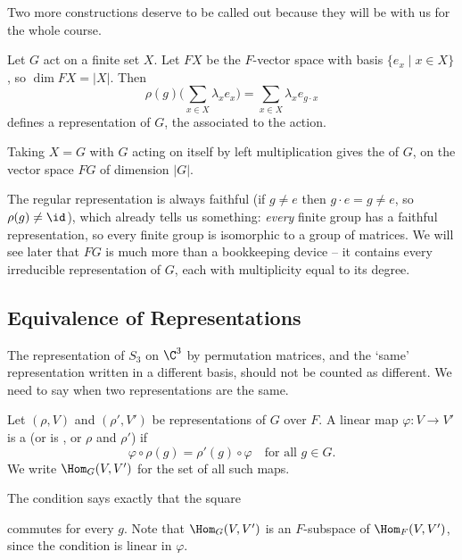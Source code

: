 Two more constructions deserve to be called out because they will be with us for the whole course.

\begin{definition}
	Let $G$ act on a finite set $X$. Let $FX$ be the $F$-vector space with basis $\{e_x \mid x \in X\}$, so $\dim FX = |X|$. Then
	$$\rho(g)\Big(\sum_{x \in X} \lambda_x e_x\Big) = \sum_{x \in X} \lambda_x e_{g \cdot x}$$
	defines a representation of $G$, the  associated to the action.
\end{definition}

\begin{definition}
	Taking $X = G$ with $G$ acting on itself by left multiplication gives the  of $G$, on the vector space $FG$ of dimension $|G|$.
\end{definition}

The regular representation is always faithful (if $g \neq e$ then $g \cdot e = g \neq e$, so $\rho(g) \neq \id$), which already tells us something: \emph{every} finite group has a faithful representation, so every finite group is isomorphic to a group of matrices. We will see later that $FG$ is much more than a bookkeeping device -- it contains every irreducible representation of $G$, each with multiplicity equal to its degree.

\subsection{Equivalence of Representations}

The representation of $S_3$ on $\C^3$ by permutation matrices, and the `same' representation written in a different basis, should not be counted as different. We need to say when two representations are the same.

\begin{definition}[$G$-homomorphism]
	Let $(\rho, V)$ and $(\rho', V')$ be representations of $G$ over $F$. A linear map $\varphi : V \to V'$ is a  (or is , or  $\rho$ and $\rho'$) if
	$$\varphi \circ \rho(g) = \rho'(g) \circ \varphi \quad \text{for all } g \in G.$$
	We write $\Hom_G(V, V')$ for the set of all such maps.
\end{definition}

The condition says exactly that the square
\begin{center}
\end{center}
commutes for every $g$. Note that $\Hom_G(V,V')$ is an $F$-subspace of $\Hom_F(V,V')$, since the condition is linear in $\varphi$.

